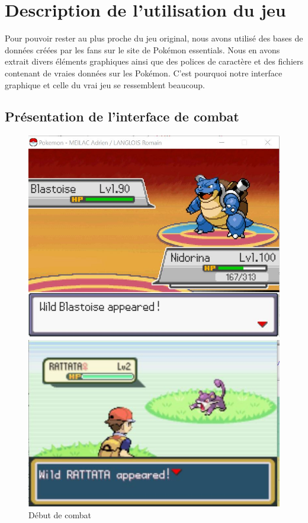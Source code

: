 \documentclass[a4paper,twoside, openany,11pt]{book}
\begin{document}
\newpage 
\pagestyle{PageNormale}

\section{Description de l'utilisation du jeu}
Pour pouvoir rester au plus proche du jeu original, nous avons utilisé des bases de données créées par les fans sur le site de Pokémon essentials. Nous en avons extrait divers éléments graphiques ainsi que des polices de caractère et des fichiers contenant de vraies données sur les Pokémon. C'est pourquoi notre  interface graphique et celle du vrai jeu se ressemblent beaucoup. 

\subsection{Présentation de l'interface de combat}
\begin{figure}[!h]
\begin{minipage}{0.49\textwidth}
\includegraphics[scale = 0.6]{Images/combat_start.jpg}
\end{minipage}
\begin{minipage}{0.49\textwidth}
\includegraphics[scale = 0.84]{Images/vrai_jeu_combat_start.jpg}
\end{minipage}
\caption{Début de combat}
\end{figure}
\end{document}
